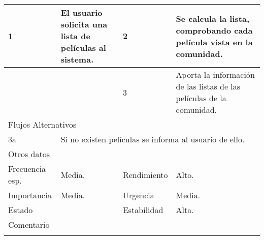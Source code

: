 \documentclass{article}
\begin{document}
\begin{table}[h]
\begin{tabular}{|l|l|l|l|l|l|}
\hline
\multicolumn{1}{|p{1cm}|}{1} & \multicolumn{2}{p{3cm}}{El usuario solicita una lista de películas al sistema.} & \multicolumn{1}{|p{1cm}|}{2} & \multicolumn{2}{p{3cm}|}{Se calcula la lista, comprobando cada película vista en la comunidad.}\\
\hline
\multicolumn{1}{|p{1cm}|}{} & \multicolumn{2}{p{3cm}}{} & \multicolumn{1}{|p{1cm}|}{3} & \multicolumn{2}{p{3cm}|}{Aporta la información de las listas de las películas de la comunidad.}\\
\hline
\multicolumn{6}{|p{10cm}|}{Flujos Alternativos}\\
\hline
\multicolumn{1}{|p{1cm}}{3a} & \multicolumn{5}{|p{9cm}|}{Si no existen películas se informa al usuario de ello.}\\
\hline
\multicolumn{6}{|p{10cm}|}{Otros datos}\\
\hline
\multicolumn{1}{|p{2cm}|}{Frecuencia esp.} & \multicolumn{2}{p{3cm}}{Media.} & \multicolumn{1}{|p{2cm}|}{Rendimiento} & \multicolumn{2}{p{3cm}|}{Alto.}\\
\hline
\multicolumn{1}{|p{2cm}|}{Importancia} & \multicolumn{2}{p{3cm}}{Media.} & \multicolumn{1}{|p{2cm}|}{Urgencia} & \multicolumn{2}{p{3cm}|}{Media.}\\
\hline
\multicolumn{1}{|p{2cm}|}{Estado} & \multicolumn{2}{p{3cm}}{} & \multicolumn{1}{|p{2cm}|}{Estabilidad} & \multicolumn{2}{p{3cm}|}{Alta.}\\
\hline
\multicolumn{6}{|p{10cm}|}{Comentario}\\
\hline
\multicolumn{6}{|p{10cm}|}{}\\
\hline
\end{tabular}
\end{table}
\end{document}
